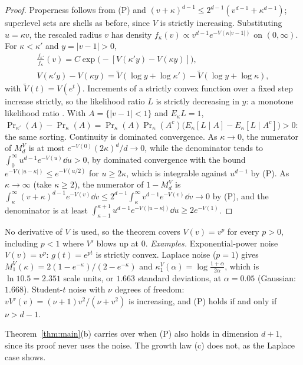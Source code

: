 \begin{proof}
Properness follows from (P) and $(v + \kappa)^{d-1} \le 2^{d-1}(v^{d-1} + \kappa^{d-1})$; superlevel sets are shells as
before, since $V$ is strictly increasing. Substituting $u = \kappa v$, the rescaled radius $v$ has density
$f_\kappa(v) \propto v^{d-1}e^{-V(\kappa|v-1|)}$ on $(0, \infty)$. For $\kappa < \kappa'$ and $y = |v - 1| > 0$,
\begin{gather*}
\frac{f_{\kappa'}}{f_\kappa}(v) = C\exp\bigl(-[V(\kappa'y) - V(\kappa y)]\bigr), \\
V(\kappa' y) - V(\kappa y) = \tilde V(\log y + \log\kappa') - \tilde V(\log y + \log\kappa),
\end{gather*}
with $\tilde V(t) = V(e^t)$. Increments of a strictly convex function over a fixed step increase strictly, so the likelihood
ratio $L$ is strictly decreasing in $y$: a monotone likelihood ratio \citep{karlin1956}. With $A = \{|v - 1| < 1\}$ and $E_\kappa L = 1$,
$\Pr_{\kappa'}(A) - \Pr_\kappa(A) = \Pr_\kappa(A)\Pr_\kappa(A^c)\bigl(E_\kappa[L \mid A] - E_\kappa[L \mid A^c]\bigr) > 0$: the same
sorting. Continuity is dominated convergence. As $\kappa \to 0$, the numerator of $M_d^V$ is at most
$e^{-V(0)}(2\kappa)^d/d \to 0$, while the denominator tends to $\int_0^\infty u^{d-1}e^{-V(u)}\dd u > 0$, by dominated
convergence with the bound $e^{-V(|u-\kappa|)} \le e^{-V(u/2)}$ for $u \ge 2\kappa$, which is integrable against $u^{d-1}$
by (P). As $\kappa \to \infty$ (take $\kappa \ge 2$), the numerator of $1 - M_d^V$ is
$\int_\kappa^\infty (v + \kappa)^{d-1}e^{-V(v)}\dd v \le 2^{d-1}\int_\kappa^\infty v^{d-1}e^{-V(v)}\dd v \to 0$ by (P), and
the denominator is at least $\int_{\kappa-1}^{\kappa+1} u^{d-1}e^{-V(|u-\kappa|)}\dd u \ge 2e^{-V(1)}$.
\end{proof}

No derivative of $V$ is used, so the theorem covers $V(v) = v^p$ for every $p > 0$, including $p < 1$ where $V'$ blows
up at $0$. \emph{Examples.} Exponential-power noise $V(v) = v^p$: $g(t) = e^{pt}$ is strictly convex. Laplace noise
($p = 1$) gives $M_1^V(\kappa) = 2(1 - e^{-\kappa})/(2 - e^{-\kappa})$ and $\kappa_1^V(\alpha) = \log\frac{1+\alpha}{2\alpha}$,
which is $\ln 10.5 = 2.351$ scale units, or $1.663$ standard deviations, at $\alpha = 0.05$ (Gaussian: $1.668$).
Student-$t$ noise with $\nu$ degrees of freedom: $vV'(v) = (\nu+1)v^2/(\nu + v^2)$ is increasing, and (P) holds if and
only if $\nu > d - 1$.

\begin{remark}\label{rem:carry}
Theorem~\ref{thm:main}(b) carries over when (P) also holds in dimension $d+1$, since its proof never uses the noise.
The growth law (c) does not, as the Laplace case shows.
\end{remark}

